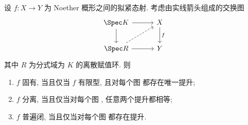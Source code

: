 \begin{theorem}[固有/分离/普遍闭态射的赋值判别法]\label{src:A.4.5}
设 $f:X\to Y$ 为 Noether 概形之间的拟紧态射. 考虑由实线箭头组成的交换图
\begin{equation}\label{src:A.4.6}
\begin{tikzcd}[column sep=3em,row sep=2em]
\Spec K\arrow[r]\arrow[d]&X\arrow[d,"f"]\\
\Spec R\arrow[r]\arrow[ur,dashed]&Y
\end{tikzcd}
\end{equation}
其中 $R$ 为分式域为 $K$ 的离散赋值环. 则
\begin{enumerate}[(1)]
\item $f$ 固有, 当且仅当 $f$ 有限型, 且对每个图  都存在唯一提升;
\item $f$ 分离, 当且仅当对每个图 , 任意两个提升都相等;
\item $f$ 普遍闭, 当且仅当对每个图  都存在提升.
\end{enumerate}
\end{theorem}
